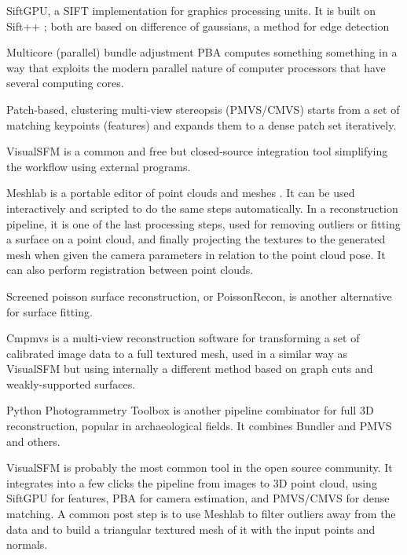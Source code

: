 SiftGPU, a SIFT implementation for graphics processing units. \cite{changchang2007siftgpu} It is built on Sift++ \cite{vedaldi2011sift++}; both are based on difference of gaussians, a method for edge detection \cite{marr1980theory}

Multicore (parallel) bundle adjustment PBA computes something something in a way that exploits the modern parallel nature of computer processors that have several computing cores. \cite{wu2011multicore}

Patch-based, clustering multi-view stereopsis (PMVS/CMVS) starts from a set of matching keypoints (features) and expands them to a dense patch set iteratively. \cite{furukawa2010accurate,furukawa2012patch}

VisualSFM \cite{wu2013towards} is a common and free but closed-source integration tool simplifying the workflow using external programs.

Meshlab is a portable editor of point clouds and meshes \cite{meshlab}.
It can be used interactively and scripted to do the same steps automatically.
In a reconstruction pipeline, it is one of the last processing steps, used for removing outliers or fitting a surface on a point cloud, and finally projecting the textures to the generated mesh when given the camera parameters in relation to the point cloud pose.
It can also perform registration between point clouds.

Screened poisson surface reconstruction, or PoissonRecon, is another alternative for surface fitting. \cite{kazhdan2013screened}

Cmpmvs is a multi-view reconstruction software for transforming a set of calibrated image data to a full textured mesh, used in a similar way as VisualSFM but using internally a different method based on graph cuts and weakly-supported surfaces.
\cite{jancosek2011multi}

Python Photogrammetry Toolbox is another pipeline combinator for full 3D reconstruction, popular in archaeological fields. It combines Bundler and PMVS and others. \cite{moulon2011python}

VisualSFM is probably the most common tool in the open source community.
It integrates into a few clicks the pipeline from images to 3D point cloud, using SiftGPU for features, PBA for camera estimation, and PMVS/CMVS for dense matching.
A common post step is to use Meshlab to filter outliers away from the data and to build a triangular textured mesh of it with the input points and normals.


